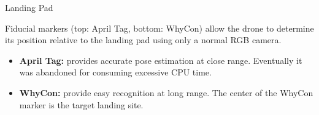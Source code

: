 \documentclass[final, 20pt]{beamer}
\newlength{\colwidth}
\begin{document}
\begin{frame}[t]
\begin{columns}[t]
\begin{column}{\colwidth}
  \begin{block}{Landing Pad}

    \begin{figure}
    \end{figure}

    Fiducial markers (top: April Tag\cite{apriltag_paper}, bottom: WhyCon\cite{whycon_paper}) allow the drone to determine its position relative to the landing pad using only a normal RGB camera.

    \begin{itemize}
      \item \textbf{April Tag:} provides accurate pose estimation at close range. Eventually it was abandoned for consuming excessive CPU time.
      \item \textbf{WhyCon:} provide easy recognition at long range. The center of the WhyCon marker is the target landing site.
    \end{itemize}



\end{block}
\end{column}
\end{columns}
\end{frame}
\end{document}
